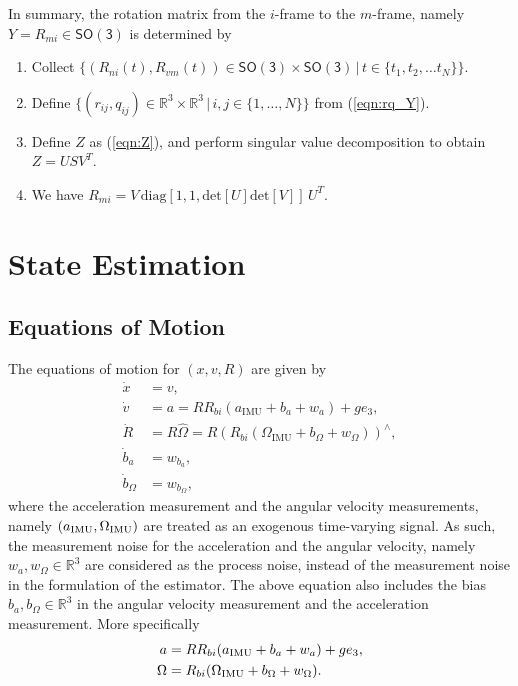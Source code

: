 \documentclass[11pt]{article}
\newcommand{\SO}{\ensuremath{\mathsf{SO(3)}}}
\renewcommand{\Re}{\ensuremath{\mathbb{R}}}
\newcommand{\refeqn}[1]{(\ref{eqn:#1})}
\begin{document}
In summary, the rotation matrix from the $i$-frame to the $m$-frame, namely $Y=R_{mi}\in\SO$ is determined by
\begin{enumerate}
\item Collect $\{(R_{ni}(t),R_{vm}(t))\in\SO\times\SO\,|\, t\in\{t_1,t_2,\ldots t_N\}\}$.
\item Define $\{(r_{ij},q_{ij})\in\Re^3\times \Re^3\,|\,i,j\in\{1,\ldots,N\}\}$ from \refeqn{rq_Y}.
\item Define $Z$ as \refeqn{Z}, and perform singular value decomposition to obtain $Z=USV^T$.
\item We have 
$R_{mi}= V\,\mathrm{diag}[1,1,\mathrm{det}[U]\mathrm{det}[V]]\, U^T$.
\end{enumerate}



\section{State Estimation}


\subsection{Equations of Motion}

The equations of motion for $(x,v,R)$ are given by 
\begin{align}
\dot x & = v,\label{eqn:x_dot}\\
\dot v & = a =R R_{bi} (a_{\mathrm{IMU}}+b_a+w_a) + ge_3,\\
\dot R & = R\hat\Omega = R(R_{bi}(\Omega_{\mathrm{IMU}}+b_\Omega+w_\Omega))^\wedge,\label{eqn:R_dot}\\
\dot b_a & = w_{b_a}\label{eqn:ba_dot},\\
\dot b_\Omega &  = w_{b_\Omega},\label{eqn:bW_dot}
\end{align}
where the acceleration measurement and the angular velocity measurements, namely $(a_{\mathrm{IMU}},\Omega_{\mathrm{IMU}})$ are treated as an exogenous time-varying signal. As such, the measurement noise for the acceleration and the angular velocity, namely $w_a,w_\Omega\in\Re^3$ are considered as the process noise, instead of the measurement noise in the formulation of the estimator. The above equation also includes the bias $b_a,b_\Omega\in\Re^3$ in the angular velocity measurement and the acceleration measurement. More specifically
\begin{align}
a &= R R_{bi} (a_{\mathrm{IMU}}+ b_a +w_a) + g e_3,\\
\Omega &= R_{bi}(\Omega_{\mathrm{IMU}} + b_\Omega  + w_\Omega). 
\end{align}
\end{document}
